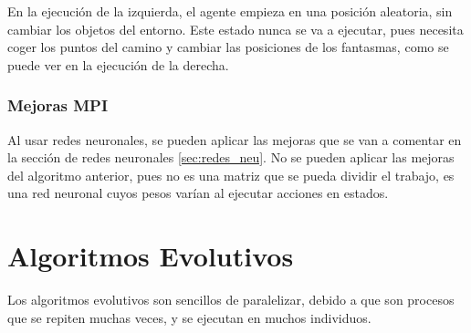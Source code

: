 			En la ejecución de la izquierda, el agente empieza en una posición aleatoria, sin cambiar los objetos del entorno. Este estado nunca se va a ejecutar, pues necesita coger los puntos del camino y cambiar las posiciones de los fantasmas, como se puede ver en la ejecución de la derecha.
			
		\subsubsection{Mejoras MPI}
		
			Al usar redes neuronales, se pueden aplicar las mejoras que se van a comentar en la sección de redes neuronales \ref{sec:redes_neu}. No se pueden aplicar las mejoras del algoritmo anterior, pues no es una matriz que se pueda dividir el trabajo, es una red neuronal cuyos pesos varían al ejecutar acciones en estados.
		
			
		
		
		
			
		
		
	
		
	
	\newpage
	


\section{Algoritmos Evolutivos}
	Los algoritmos evolutivos son sencillos de paralelizar, debido a que son procesos que se repiten muchas veces, y se ejecutan en muchos individuos.
	
